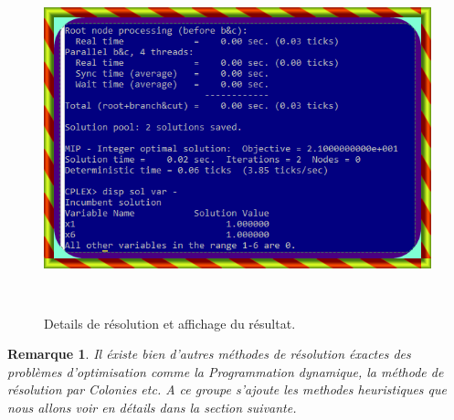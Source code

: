 \documentclass[a4paper,11pt,oneside]{report}
\newtheorem{remarque}{Remarque}[section]
\theoremstyle{plain}
\newcommand{\0}{/ \! \! \! 0}
\theoremstyle{plain}
\begin{document}
  \newpage
 \begin{figure}[htbp]
  \begin{center}
  \includegraphics[height=10cm,width=16cm]{tp2.png}
  \caption{\label{fig2} Details de r\'esolution et affichage du r\'esultat.}
  \end{center}
  \end{figure}
\begin{remarque}
Il \'existe bien d'autres m\'ethodes de r\'esolution \'exactes des probl\`emes d'optimisation comme la Programmation dynamique, la m\'ethode 
de r\'esolution par Colonies etc. A ce groupe s'ajoute les methodes heuristiques que nous allons voir en d\'etails dans la section suivante.
\end{remarque}\newpage
\end{document}
